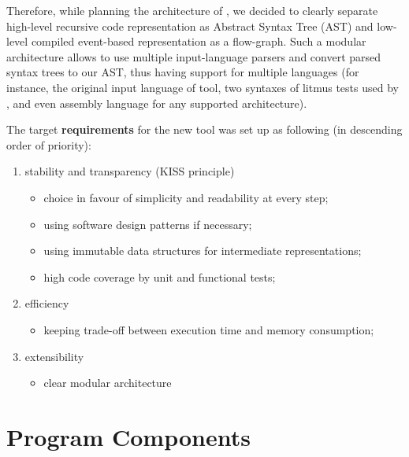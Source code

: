 Therefore, while planning the architecture of \mousquetaires, we decided to clearly separate high-level recursive code representation as Abstract Syntax Tree (AST) and low-level compiled event-based representation as a flow-graph. Such a modular architecture allows to use multiple input-language parsers and convert parsed syntax trees to our AST, thus having support for multiple languages (for instance, the original input language of \Porthos tool, two syntaxes of litmus tests used by , and even assembly language for any supported architecture).

The target \textbf{requirements} for the new tool was set up as following (in descending order of priority):

\begin{enumerate}[nolistsep]
        \item stability and transparency (KISS principle)
                \begin{itemize}
                        \item choice in favour of simplicity and readability at every step;
                        \item using software design patterns if necessary;
                        \item using immutable data structures for intermediate representations;
                        \item high code coverage by unit and functional tests;
                \end{itemize}                
        \item efficiency
                \begin{itemize}
                        \item keeping trade-off between execution time and memory consumption;
                \end{itemize}
        \item extensibility
                \begin{itemize}
                        \item clear modular architecture
                \end{itemize}
\end{enumerate}

\section{Program Components}
\label{ch:impl:comp}

